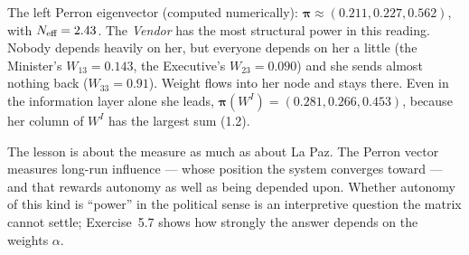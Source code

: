 \documentclass[../structural_economics_book.tex]{subfiles}
\begin{document}
\begin{example}
The left Perron eigenvector (computed numerically): $\boldsymbol{\pi} \approx (0.211, 0.227, 0.562)$, with $N_{\text{eff}} = 2.43$. The \textit{Vendor} has the most structural power in this reading. Nobody depends heavily on her, but everyone depends on her a little (the Minister's $W_{13} = 0.143$, the Executive's $W_{23} = 0.090$) and she sends almost nothing back ($W_{33} = 0.91$). Weight flows into her node and stays there. Even in the information layer alone she leads, $\boldsymbol{\pi}(W^I) = (0.281, 0.266, 0.453)$, because her column of $W^I$ has the largest sum (1.2).

The lesson is about the measure as much as about La Paz. The Perron vector measures long-run influence --- whose position the system converges toward --- and that rewards autonomy as well as being depended upon. Whether autonomy of this kind is ``power'' in the political sense is an interpretive question the matrix cannot settle; Exercise~5.7 shows how strongly the answer depends on the weights $\alpha$.
\end{example}
\end{document}
